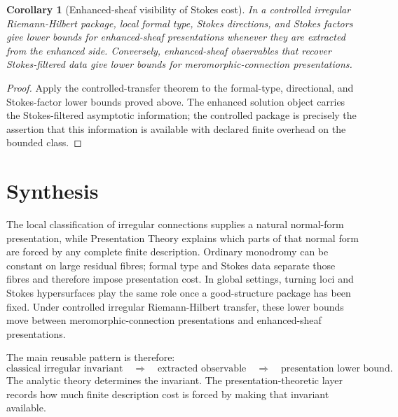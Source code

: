 \documentclass[11pt]{article}
\newtheorem{corollary}[theorem]{Corollary}
\begin{document}
\begin{corollary}[Enhanced-sheaf visibility of Stokes cost]
In a controlled irregular Riemann-Hilbert package, local formal type, Stokes directions, and Stokes factors give lower bounds for enhanced-sheaf presentations whenever they are extracted from the enhanced side.  Conversely, enhanced-sheaf observables that recover Stokes-filtered data give lower bounds for meromorphic-connection presentations.
\end{corollary}

\begin{proof}
Apply the controlled-transfer theorem to the formal-type, directional, and Stokes-factor lower bounds proved above.  The enhanced solution object carries the Stokes-filtered asymptotic information; the controlled package is precisely the assertion that this information is available with declared finite overhead on the bounded class.
\end{proof}

\section{Synthesis}

The local classification of irregular connections supplies a natural normal-form presentation, while Presentation Theory explains which parts of that normal form are forced by any complete finite description.  Ordinary monodromy can be constant on large residual fibres; formal type and Stokes data separate those fibres and therefore impose presentation cost.  In global settings, turning loci and Stokes hypersurfaces play the same role once a good-structure package has been fixed.  Under controlled irregular Riemann-Hilbert transfer, these lower bounds move between meromorphic-connection presentations and enhanced-sheaf presentations.

The main reusable pattern is therefore:
\[
\text{classical irregular invariant}
\quad\Longrightarrow\quad
\text{extracted observable}
\quad\Longrightarrow\quad
\text{presentation lower bound}.
\]
The analytic theory determines the invariant.  The presentation-theoretic layer records how much finite description cost is forced by making that invariant available.
\end{document}
